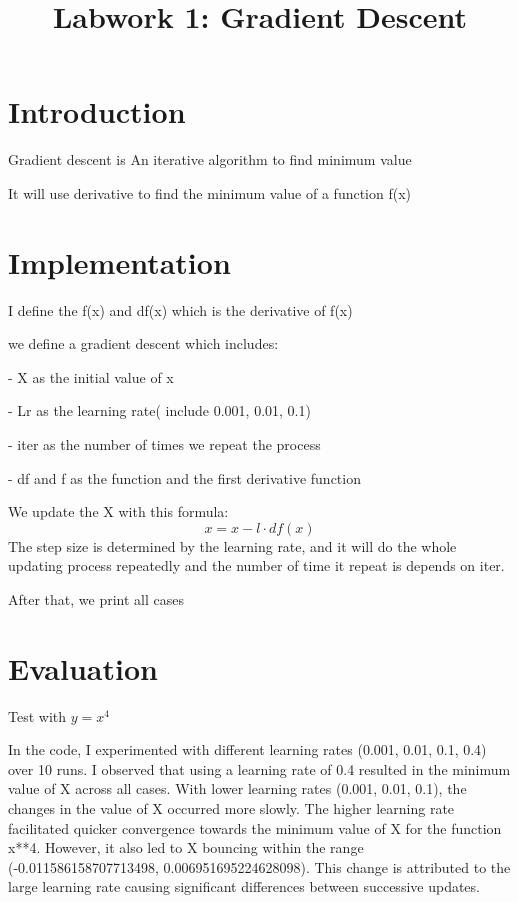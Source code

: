 \documentclass{article}
\title{Labwork 1: Gradient Descent}
\begin{document}
\maketitle

\setlength\parindent{0pt}

\section{Introduction}

Gradient descent is An iterative algorithm to find minimum value

It will use derivative to find the minimum value of a function f(x)

\section{Implementation}

I define the f(x) and df(x) which is the derivative of f(x)

we define a gradient descent which includes:

- X as the initial value of x

- Lr as the learning rate( include 0.001, 0.01, 0.1)

- iter as the number of times we repeat the process

- df and f as the function and the first derivative function


We update the X with this formula: 
$$x = x - l \cdot df(x)$$
The step size is determined by the learning rate, and it will do the whole updating process repeatedly and the number of time it repeat is depends on iter.

After that, we print all cases 

\section{Evaluation}

Test with $y = x^4$

In the code, I experimented with different learning rates (0.001, 0.01, 0.1, 0.4) over 10 runs. I observed that using a learning rate of 0.4 resulted in the minimum value of X across all cases. With lower learning rates (0.001, 0.01, 0.1), the changes in the value of X occurred more slowly. The higher learning rate facilitated quicker convergence towards the minimum value of X for the function x**4. However, it also led to X bouncing within the range (-0.011586158707713498, 0.006951695224628098). This change is attributed to the large learning rate causing significant differences between successive updates.
\end{document}
